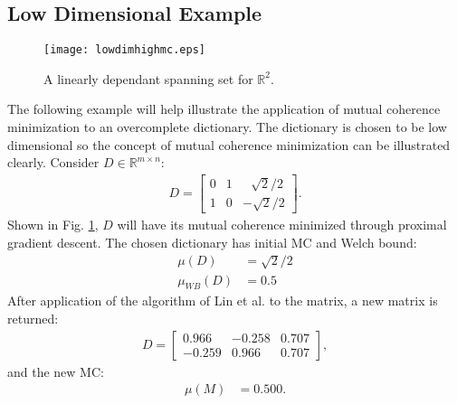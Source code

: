 \documentclass[journal]{IEEEtran}
\begin{document}
\subsection{Low Dimensional Example}
\begin{figure}[!h]
\centering
\texttt{[image: lowdimhighmc.eps]}
\caption{A linearly dependant spanning set for $\mathbb{R}^2$.}
\label{Fig:lowdimhigh}
\end{figure}
\noindent The following example will help illustrate the application of mutual coherence minimization
to an overcomplete dictionary. The dictionary is chosen to be low dimensional so the concept
of mutual coherence minimization can be illustrated clearly.
Consider $D \in \mathbb{R}^{m\times n}$:
\begin{align}
    D = \begin{bmatrix} 0 &1 &\>\>\>\sqrt{2}/2 \\
                        1 &0 &-\sqrt{2}/2 \end{bmatrix}.
\end{align}
Shown in Fig. \ref{Fig:lowdimhigh}, $D$ will have its mutual coherence minimized through proximal
gradient descent.
The chosen dictionary has initial MC and Welch bound:
\begin{align}
\mu (D) &= \sqrt{2}/2 \\
\mu_{WB} (D) &= 0.5
\end{align}
After application of the algorithm of Lin et al. to the matrix, a new matrix is returned:
\begin{align}
    D = \left[\begin{array}{ccc} 0.966 & -0.258  &0.707\\ -0.259 & 0.966 & 0.707 \end{array}\right],
\end{align}
and the new MC:
\begin{align}
\mu (M) &= 0.500. 
\end{align}
\end{document}
